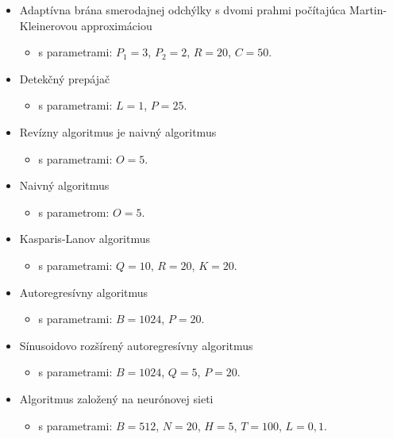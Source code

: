 \begin{itemize}
  \item Adaptívna brána smerodajnej odchýlky s dvomi prahmi počítajúca Martin-Kleinerovou approximáciou
  \begin{itemize}
  	\item s parametrami: $P_1=3$, $P_2=2$, $R=20$, $C=50$.
  \end{itemize}
  \item Detekčný prepájač
  \begin{itemize}
    \item s parametrami: $L=1$, $P=25$.
  \end{itemize}
  \item Revízny algoritmus je naivný algoritmus
  \begin{itemize}
      \item s parametrami: $O=5$.
  \end{itemize}
\end{itemize}

\begin{itemize}
  \item Naivný algoritmus 
  \begin{itemize}
    \item s parametrom: $O=5$.
  \end{itemize}
  \item Kasparis-Lanov algoritmus
  \begin{itemize}
    \item s parametrami: $Q=10$, $R=20$, $K=20$.
  \end{itemize}
  \item Autoregresívny algoritmus
  \begin{itemize}
    \item s parametrami: $B=1024$, $P=20$.
  \end{itemize}
  \item Sínusoidovo rozšírený autoregresívny algoritmus
  \begin{itemize}
	\item s parametrami: $B=1024$, $Q=5$, $P=20$.
  \end{itemize}
  \item Algoritmus založený na neurónovej sieti
  \begin{itemize}
    \item s parametrami: $B=512$, $N=20$, $H=5$, $T=100$, $L=0,1$.
  \end{itemize}
\end{itemize}


